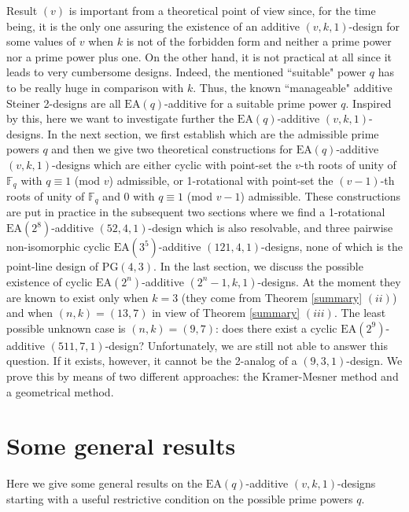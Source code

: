 \documentclass[a4paper, 11pt]{article}
\theoremstyle{definition}
\theoremstyle{definition}
\theoremstyle{definition}
\newcommand{\F}{\mathbb{F}}
\numberwithin{equation}{section}
\begin{document}
Result $(v)$ is important from a theoretical point of view since, for the time being, it is
the only one assuring the existence of an additive $(v,k,1)$-design for some
values of $v$ when $k$ is not of the forbidden form and neither a prime power nor a prime power plus one. On the other hand, it is not practical at
all since it leads to very cumbersome designs. Indeed, the mentioned ``suitable" power $q$ has 
to be really huge in comparison with $k$.
Thus, the known ``manageable"  additive Steiner 2-designs are all $\mathrm{EA}(q)$-additive
for a suitable prime power $q$.
Inspired by this, here we want to investigate further the $\mathrm{EA}(q)$-additive $(v,k,1)$-designs.
In the next section, we first establish which are the admissible prime powers $q$
and then we give two theoretical constructions for $\mathrm{EA}(q)$-additive $(v,k,1)$-designs
which are either cyclic with point-set the $v$-th roots of unity of $\F_q$ with $q\equiv1$ (mod $v$) admissible, 
or 1-rotational with point-set the $(v-1)$-th roots of unity of $\F_q$ and 0 with $q\equiv1$ (mod $v-1$) admissible.
These constructions are put in practice in the subsequent two sections where
we find a 1-rotational $\mathrm{EA}(2^8)$-additive $(52,4,1)$-design which is also resolvable, and three pairwise non-isomorphic
cyclic $\mathrm{EA}(3^5)$-additive $(121,4,1)$-designs,  none of which is the point-line design of $\mathrm{PG}(4,3)$.
In the last section, we discuss the possible existence of cyclic $\mathrm{EA}(2^n)$-additive $(2^n-1,k,1)$-designs.
At the moment they are known to exist only when $k=3$ (they come from Theorem \ref{summary} $(ii)$) and when 
$(n,k)=(13,7)$ in view of Theorem \ref{summary} $(iii)$.
The least possible unknown case is $(n,k)=(9,7)$: does there exist a cyclic $\mathrm{EA}(2^9)$-additive $(511,7,1)$-design? 
Unfortunately, we are still not able to answer this question. If it exists, however, it cannot be the 2-analog of a
$(9,3,1)$-design. We prove this by means of two different approaches: the Kramer-Mesner method and a geometrical method.



\section{Some general results}

Here we give some general results on the $\mathrm{EA}(q)$-additive $(v,k,1)$-designs
starting with a useful restrictive condition on the possible prime powers $q$. 
\end{document}
